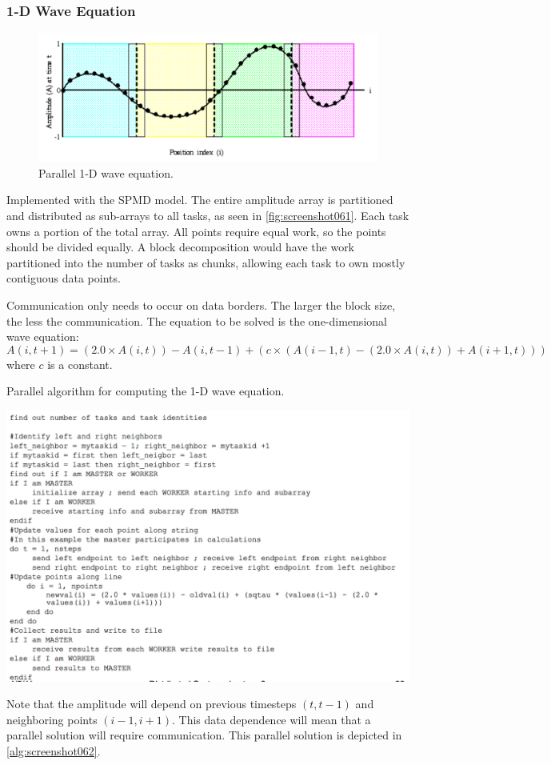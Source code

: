 \subsubsection{1-D Wave Equation}
\begin{figure}
\centering
\includegraphics[width=0.7\linewidth]{screenshot061}
\caption{Parallel 1-D wave equation.}
\label{fig:screenshot061}
\end{figure}

Implemented with the SPMD model. The entire amplitude array is partitioned and distributed as sub-arrays to all tasks, as seen in \autoref{fig:screenshot061}. Each task owns a portion of the total array. All points require equal work, so the points should be divided equally. A block decomposition would have the work partitioned into the number of tasks as chunks, allowing each task to own mostly contiguous data points. 

Communication only needs to occur on data borders. The larger the block size, the less the communication. The equation to be solved is the one-dimensional wave equation:  
\[ A(i, t+1) = (2.0 \times A(i, t)) - A(i, t-1) + (c \times (A(i-1, t) - (2.0 \times A(i, t)) + A(i+1, t))) \]
where $c$ is a constant.

\begin{algorithm}[h]
\caption{Parallel algorithm for computing the 1-D wave equation. \footnotemark}
\label{alg:screenshot062}
\includegraphics[width=\linewidth]{screenshot062}
\end{algorithm}

Note that the amplitude will depend on previous timesteps $(t, t-1)$ and neighboring points $(i-1, i+1)$. This data dependence will mean that a parallel solution will require communication. This parallel solution is depicted in \autoref{alg:screenshot062}.
